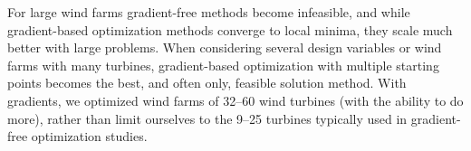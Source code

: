 \documentclass[wes, manuscript]{copernicus}
\begin{document}
For large wind farms gradient-free methods become infeasible, and while gradient-based optimization methods converge to local minima, they scale much better with large problems. %
When considering several design variables or wind farms with many turbines,
gradient-based optimization with multiple starting points becomes the best, and often only, feasible solution method. With gradients, we optimized wind farms of 32--60 wind turbines (with the ability to do more), rather than limit ourselves to the 9--25 turbines typically used in gradient-free optimization studies.%
\end{document}
